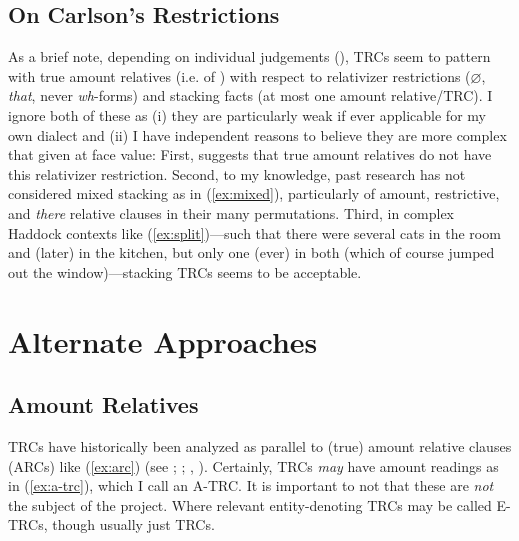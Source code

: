 \documentclass[11pt]{article}
\begin{document}
\subsection{On Carlson's Restrictions}
As a brief note, depending on individual judgements (\cite{heimWhereDoesDefiniteness1987}), TRCs seem to pattern with true amount relatives (i.e. of \cite{mendiaAmountRelativesRedux2017}) with respect to relativizer restrictions (\(\varnothing\), \textit{that}, never \textit{wh}-forms) and stacking facts (at most one amount relative/TRC). I ignore both of these as (i) they are particularly weak if ever applicable for my own dialect and (ii) I have independent reasons to believe they are more complex that given at face value: First, \citet{kayThatVsWhich} suggests that true amount relatives do not have this relativizer restriction. Second, to my knowledge, past research has not considered mixed stacking as in (\ref{ex:mixed}), particularly of amount, restrictive, and \textit{there} relative clauses in their many permutations. Third, in complex Haddock contexts like (\ref{ex:split})---such that there were several cats in the room and (later) in the kitchen, but only one (ever) in both (which of course jumped out the window)---stacking TRCs seems to be acceptable.

\begin{exe}
	\label{ex:mixed}
	\label{ex:split}
\end{exe}

\section{Alternate Approaches}

\subsection{Amount Relatives}

TRCs have historically been analyzed as parallel to (true) amount relative clauses (ARCs) like (\ref{ex:arc}) (see \cite{carlsonAmountRelatives1977}; \cite{heimWhereDoesDefiniteness1987}; \cite{grosuStrangeRelativesThird1998}, \citeyear{grosuAmountRelatives2017}). Certainly, TRCs \textit{may} have amount readings as in (\ref{ex:a-trc}), which I call an A-TRC. It is important to not that these are \textit{not} the subject of the project. Where relevant entity-denoting TRCs may be called E-TRCs, though usually just TRCs.
\end{document}
